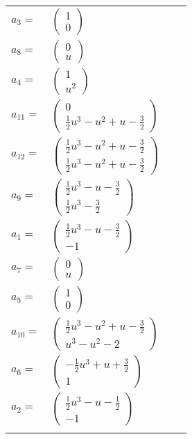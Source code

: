 \documentclass[1p]{elsarticle_modified}
\theoremstyle{definition}
\begin{document}
\begin{tabular}{m{7pt} m{180pt} m{7pt} m{180pt} }
\flushright $a_{3}=$&$\begin{pmatrix}1\\0\end{pmatrix}$ \\
\flushright $a_{8}=$&$\begin{pmatrix}0\\u\end{pmatrix}$ \\
\flushright $a_{4}=$&$\begin{pmatrix}1\\u^2\end{pmatrix}$ \\
\flushright $a_{11}=$&$\begin{pmatrix}0\\\frac{1}{2} u^3- u^2+u-\frac{3}{2}\end{pmatrix}$ \\
\flushright $a_{12}=$&$\begin{pmatrix}\frac{1}{2} u^3- u^2+u-\frac{3}{2}\\\frac{1}{2} u^3- u^2+u-\frac{3}{2}\end{pmatrix}$ \\
\flushright $a_{9}=$&$\begin{pmatrix}\frac{1}{2} u^3- u-\frac{3}{2}\\\frac{1}{2} u^3-\frac{3}{2}\end{pmatrix}$ \\
\flushright $a_{1}=$&$\begin{pmatrix}\frac{1}{2} u^3- u-\frac{3}{2}\\-1\end{pmatrix}$ \\
\flushright $a_{7}=$&$\begin{pmatrix}0\\u\end{pmatrix}$ \\
\flushright $a_{5}=$&$\begin{pmatrix}1\\0\end{pmatrix}$ \\
\flushright $a_{10}=$&$\begin{pmatrix}\frac{1}{2} u^3- u^2+u-\frac{3}{2}\\u^3- u^2-2\end{pmatrix}$ \\
\flushright $a_{6}=$&$\begin{pmatrix}-\frac{1}{2} u^3+u+\frac{3}{2}\\1\end{pmatrix}$ \\
\flushright $a_{2}=$&$\begin{pmatrix}\frac{1}{2} u^3- u-\frac{1}{2}\\-1\end{pmatrix}$\\&\end{tabular}
\end{document}
